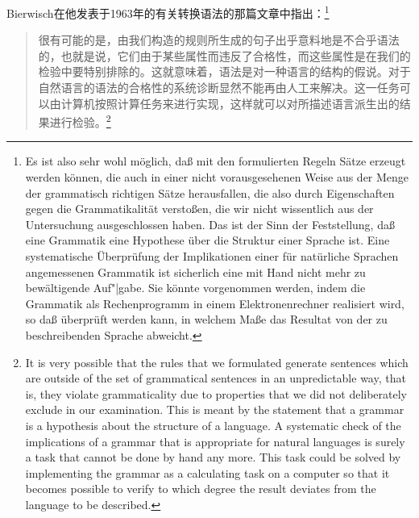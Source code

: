 Bierwisch在他发表于1963年的有关转换语法的那篇文章中指出：\footnote{%
Es ist also sehr wohl möglich, daß mit den formulierten Regeln Sätze erzeugt werden können,
die auch in einer nicht vorausgesehenen Weise aus der Menge der grammatisch richtigen Sätze herausfallen,
die also durch Eigenschaften gegen die Grammatikalität verstoßen, die wir nicht wissentlich aus
der Untersuchung ausgeschlossen haben. Das ist der Sinn der Feststellung, daß eine Grammatik
eine Hypothese über die Struktur einer Sprache ist. Eine systematische Überprüfung der Implikationen
einer für natürliche Sprachen angemessenen Grammatik ist sicherlich eine mit Hand nicht mehr
zu bewältigende Auf"|gabe. Sie könnte vorgenommen werden, indem die Grammatik als Rechenprogramm in einem
Elektronenrechner realisiert wird, so daß überprüft werden kann, in welchem Maße das Resultat
von der zu beschreibenden Sprache abweicht.}
\begin{quotation}
很有可能的是，由我们构造的规则所生成的句子出乎意料地是不合乎语法的，也就是说，它们由于某些属性而违反了合格性，而这些属性是在我们的检验中要特别排除的。这就意味着，语法是对一种语言的结构的假说。对于自然语言的语法的合格性的系统诊断显然不能再由人工来解决。这一任务可以由计算机按照计算任务来进行实现，这样就可以对所描述语言派生出的结果进行检验。\citep*[]{Bierwisch63}\footnote{%
It is very possible that the rules that we formulated generate
sentences which are outside of the set of grammatical sentences in an
unpredictable way, that is, they violate grammaticality due to
properties that we did not deliberately exclude in our examination. This
is meant by the statement that a grammar is a hypothesis about the
structure of a language. A systematic check of the implications of a
grammar that is appropriate for natural languages is surely a task that
cannot be done by hand any more. This task could be solved by
implementing the grammar as a calculating task on a computer so that it
becomes possible to verify to which degree the result deviates from the
language to be described. }
\end{quotation}
